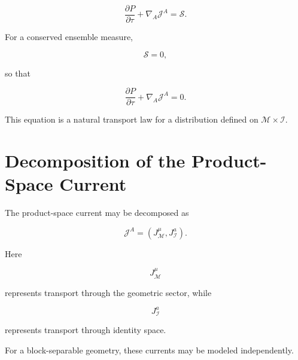 \documentclass[12pt,oneside]{book}
\begin{document}
\begin{equation}
    \frac{\partial P}{\partial\tau}
    +
    \nabla_A
    \mathcal{J}^A
    =
    \mathcal{S}.
    \label{eq:product-space-continuity}
\end{equation}

For a conserved ensemble measure,

\begin{equation}
    \mathcal{S}
    =
    0,
\end{equation}

so that

\begin{equation}
    \frac{\partial P}{\partial\tau}
    +
    \nabla_A
    \mathcal{J}^A
    =
    0.
    \label{eq:product-space-conservation}
\end{equation}

This equation is a natural transport law for a distribution
defined on \(\mathcal{M}\times\mathcal{I}\).


\section{Decomposition of the Product-Space Current}
\label{sec:product-current-decomposition}

The product-space current may be decomposed as

\begin{equation}
    \mathcal{J}^A
    =
    \left(
        J_{\mathcal{M}}^\mu,
        J_{\mathcal{I}}^a
    \right).
    \label{eq:product-current-decomposition}
\end{equation}

Here

\begin{equation}
    J_{\mathcal{M}}^\mu
\end{equation}

represents transport through the geometric sector, while

\begin{equation}
    J_{\mathcal{I}}^a
\end{equation}

represents transport through identity space.

For a block-separable geometry, these currents may be modeled
independently.
\end{document}
